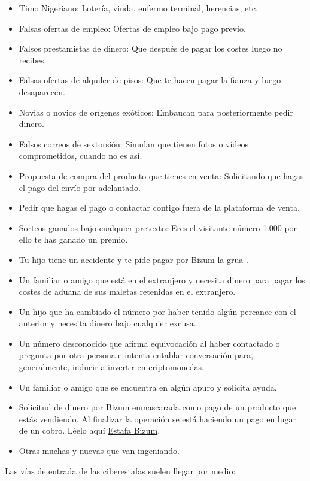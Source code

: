 \documentclass[
  a4paper,
  openany]{book}
\begin{document}
\begin{itemize}
\item
  Timo Nigeriano: Lotería, viuda, enfermo terminal, herencias, etc.
\item
  Falsas ofertas de empleo: Ofertas de empleo bajo pago previo.
\item
  Falsos prestamistas de dinero: Que después de pagar los costes luego no recibes.
\item
  Falsas ofertas de alquiler de pisos: Que te hacen pagar la fianza y luego desaparecen.
\item
  Novias o novios de orígenes exóticos: Embaucan para posteriormente pedir dinero.
\item
  Falsos correos de sextorsión: Simulan que tienen fotos o vídeos comprometidos, cuando no es así.
\item
  Propuesta de compra del producto que tienes en venta: Solicitando que hagas el pago del envío por adelantado.
\item
  Pedir que hagas el pago o contactar contigo fuera de la plataforma de venta.
\item
  Sorteos ganados bajo cualquier pretexto: Eres el visitante número 1.000 por ello te has ganado un premio.
\item
  Tu hijo tiene un accidente y te pide pagar por Bizum la grua \citep{INCI-bizum}.
\item
  Un familiar o amigo que está en el extranjero y necesita dinero para pagar los costes de aduana de sus maletas retenidas en el extranjero.
\item
  Un hijo que ha cambiado el número por haber tenido algún percance con el anterior y necesita dinero bajo cualquier excusa.
\item
  Un número desconocido que afirma equivocación al haber contactado o pregunta por otra persona e intenta entablar conversación para, generalmente, inducir a invertir en criptomonedas.
\item
  Un familiar o amigo que se encuentra en algún apuro y solicita ayuda.
\item
  Solicitud de dinero por Bizum enmascarada como pago de un producto que estás vendiendo. Al finalizar la operación se está haciendo un pago en lugar de un cobro. Léelo aquí \href{https://bizum.es/blog/estafa-bizum/}{Estafa Bizum}.
\item
  Otras muchas y nuevas que van ingeniando.
\end{itemize}

Las vías de entrada de las ciberestafas suelen llegar por medio:
\end{document}
